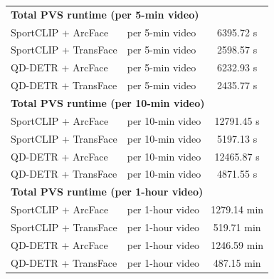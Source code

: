 \begin{table}
\begin{tabular}{l l c}
        \hline
        \multicolumn{3}{l}{\textbf{Total PVS runtime (per 5-min video)}} \\
        SportCLIP + ArcFace                      & per 5-min video                & 6395.72 s \\
        SportCLIP + TransFace                    & per 5-min video                & 2598.57 s \\
        QD-DETR + ArcFace                        & per 5-min video                & 6232.93 s \\
        QD-DETR + TransFace                      & per 5-min video                & 2435.77 s \\
        \hline
        \multicolumn{3}{l}{\textbf{Total PVS runtime (per 10-min video)}} \\
        SportCLIP + ArcFace                      & per 10-min video               & 12791.45 s \\
        SportCLIP + TransFace                    & per 10-min video               & 5197.13 s \\
        QD-DETR + ArcFace                        & per 10-min video               & 12465.87 s \\
        QD-DETR + TransFace                      & per 10-min video               & 4871.55 s \\
        \hline
        \multicolumn{3}{l}{\textbf{Total PVS runtime (per 1-hour video)}} \\
        SportCLIP + ArcFace                      & per 1-hour video               & 1279.14 min \\
        SportCLIP + TransFace                    & per 1-hour video               & 519.71 min \\
        QD-DETR + ArcFace                        & per 1-hour video               & 1246.59 min \\
        QD-DETR + TransFace                      & per 1-hour video               & 487.15 min \\
        \hline
    \end{tabular}
\end{table}